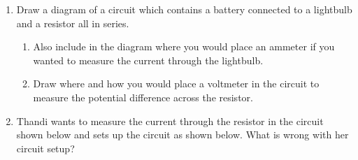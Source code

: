 \begin{enumerate}[noitemsep, label=\textbf{\arabic*}. ]
{\begin{center}
\begin{xtabular*}{\mytablewidth}[t]{|p{10\mystarwidth}|p{10\mystarwidth}|p{10\mystarwidth}|p{10\mystarwidth}|}
         &
    
    
     \tabularnewline{}
    \end{xtabular*}
      \end{center}
    \begin{center}{\small\bfseries Table 16.3}\end{center}
    
    \addtocounter{footnote}{-0}
    
        }%
      
    \par
            \item Draw a diagram of a circuit which contains a battery connected to a lightbulb and a resistor all in series. \label{m38776*id6742}\begin{enumerate}[noitemsep, label=\textbf{\alph*}. ] 
            \item  Also include in the diagram where you would place an ammeter if you wanted to measure the current through the lightbulb.\item Draw where and how you would place a voltmeter in the circuit to measure the potential difference across the resistor.\end{enumerate}
                  \item Thandi wants to measure the current through the resistor in the circuit shown below and sets up the circuit as shown below. What is wrong with her circuit setup? 

    \setcounter{subfigure}{0}



\end{enumerate}
